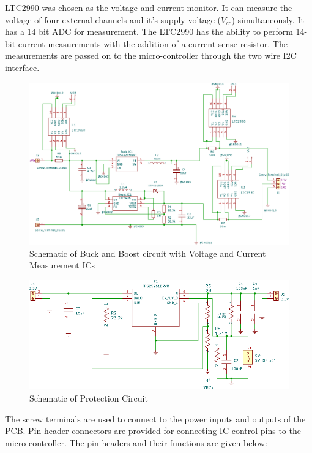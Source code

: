  LTC2990 was chosen as the voltage  and current monitor. It can measure the voltage of four external channels and it's supply voltage ($V_{cc}$) simultaneously. It has a 14 bit ADC for measurement. The LTC2990 has the ability to perform 14-bit current measurements with the addition of a current sense resistor. The measurements are passed on to the micro-controller through the two wire I2C interface.
 \begin{center}
 \begin{figure}[h]
 	\centering
 	\includegraphics[width=\columnwidth]{IMGS/1.pdf}
 	\caption{\centering Schematic of Buck and Boost circuit with Voltage and Current Measurement ICs}
 	\label{fig:bubo2}
 \end{figure}
 
  \begin{figure}[H]
 	\centering
 	\includegraphics[width=\columnwidth]{IMGS/Prot_Circ.pdf}
 	\caption{\centering Schematic of Protection Circuit}
 	\label{fig:prottecsch}
 \end{figure}
 
 
\end{center}
The screw terminals are used to connect to the power inputs and outputs of the PCB. Pin header connectors are provided for connecting IC control pins to the micro-controller. The pin headers and their functions are given below:
